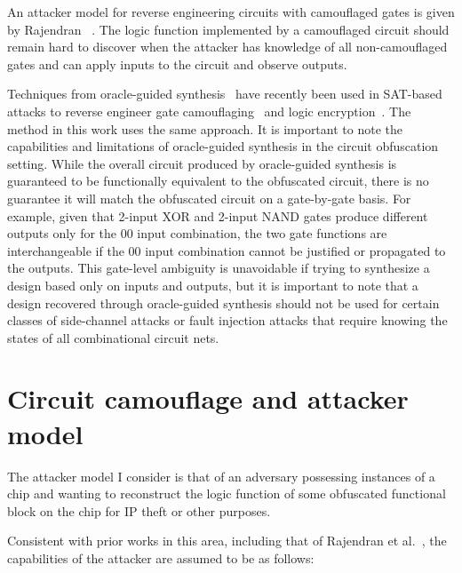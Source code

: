 \documentclass[proposal]{umassthesis}  %
\begin{document}
An attacker model for reverse engineering circuits with camouflaged gates is given by Rajendran ~\cite{rajendran-12}. The logic function implemented by a camouflaged circuit should remain hard to discover when the attacker has knowledge of all non-camouflaged gates and can apply inputs to the circuit and observe outputs. {Techniques from oracle-guided synthesis~\cite{jha2010oracle} have recently been used in SAT-based attacks to reverse engineer gate camouflaging~\cite{elmassad-15} and logic encryption~\cite{subramanyan-15}. The method in this work uses the same approach. It is important to note the capabilities and limitations of oracle-guided synthesis in the circuit obfuscation setting. While the overall circuit produced by oracle-guided synthesis is guaranteed to be functionally equivalent to the obfuscated circuit, there is no guarantee it will match the obfuscated circuit on a gate-by-gate basis. For example, given that 2-input XOR and 2-input NAND gates produce different outputs only for the 00 input combination, the two gate functions are interchangeable if the 00 input combination cannot be justified or propagated to the outputs. This gate-level ambiguity is unavoidable if trying to synthesize a design based only on inputs and outputs, but it is important to note that a design recovered through oracle-guided synthesis should not be used for certain classes of side-channel attacks or fault injection attacks that require knowing the states of all combinational circuit nets. 




















\chapter{Circuit camouflage and attacker model}

The attacker model I consider is that of an adversary possessing instances of a chip and wanting to reconstruct the logic function of some obfuscated functional block on the chip for IP theft or other purposes.} Consistent with prior works in this area, including that of Rajendran et al.~\cite{rajendran-13}, the capabilities of the attacker are assumed to be as follows: 
\end{document}

